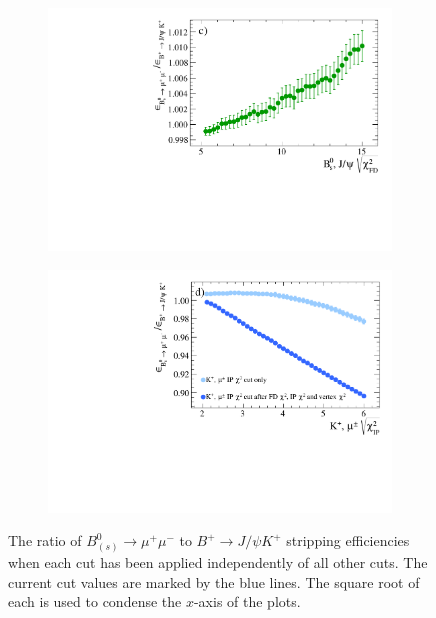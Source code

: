 \begin{figure}[htbp]
    \begin{subfigure}[b]{0.45\textwidth}
        \includegraphics[width=\textwidth]{./Figs/Selection/BsMuMu_JpsiK_FD.pdf}
        \caption{}
        \label{fig:FD_ratio}
    \end{subfigure}
   \begin{subfigure}[b]{0.45\textwidth}
        \includegraphics[width=\textwidth]{./Figs/Selection/Bs2MuMu_JpsiK_daughter_IP.pdf}
        \caption{}
        \label{fig:IPS_ratio}
    \end{subfigure}
    \caption{The ratio of $B^{0}_{(s)}\to\mu^{+} \mu^{-}$ to $B^{+}\to J/\psi K^{+}$ stripping efficiencies when each cut has been applied independently of all other cuts. The current cut values are marked by the blue lines. The square root of each \chisqd is used to condense the $x$-axis of the plots.}
    \label{fig:ratioplotsJpsik}
\end{figure}



